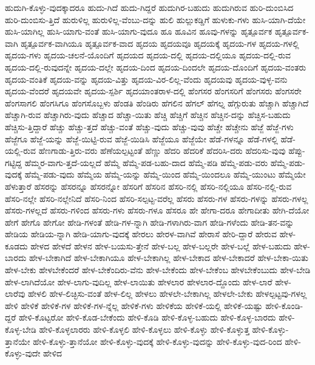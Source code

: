 {ಹುದುಗಿ-ಕೊಳ್ಳು-ವುದಕ್ಕಾದರೂ
ಹುದು-ಗಿದೆ
ಹುದು-ಗಿದ್ದರೆ
ಹುದುಗಿರ-ಬಹುದು
ಹುದುಗಿರುವ
ಹುರಿ-ದುಂಬಿಸಿದ
ಹುರಿ-ದುಂಬಿಸು-ತ್ತಿದೆ
ಹುರುಳಿಲ್ಲ
ಹುರುಳಿಲ್ಲ-ವೆಂಬು-ದನ್ನು
ಹುಲಿ
ಹುಲ್ಲುಕಡ್ಡಿಗೆ
ಹುಳುಕು-ಗಳು
ಹುಸಿ-ಯಾಗಿ-ದೆಯೇ
ಹುಸಿ-ಯಾಗಿಲ್ಲ
ಹುಸಿ-ಯಾಗು-ವಂತೆ
ಹುಸಿ-ಯಾಗು-ವುದೂ
ಹೂ
ಹೂವಿನ
ಹೂವು-ಗಳನ್ನು
ಹೃತ್ಪೂರ್ವಕ
ಹೃತ್ಪೂರ್ವಕ-ವಾಗಿ
ಹೃತ್ಪೂರ್ವಕ-ವಾಗಿಯೂ
ಹೃತ್ಪೂರ್ವಕ-ವಾದ
ಹೃದಯ
ಹೃದಯವೂ
ಹೃದಯಕ್ಕೆ
ಹೃದಯ-ಗಳ
ಹೃದಯ-ಗಳಲ್ಲಿ
ಹೃದಯ-ಗಳು
ಹೃದಯ-ಚಲನೆ-ಯೊಂದಿಗೆ
ಹೃದಯದ
ಹೃದಯ-ದಲ್ಲಿ
ಹೃದಯ-ದಲ್ಲಿಯೂ
ಹೃದಯ-ದಲ್ಲಿ-ರುವ
ಹೃದಯ-ದಲ್ಲಿ-ರುವುದನ್ನೇ
ಹೃದಯ-ದಲ್ಲೇ
ಹೃದಯ-ದಿಂದ
ಹೃದಯ-ದಿಂದಲೇ
ಹೃದಯ-ದೊಂದಿಗೆ
ಹೃದಯ-ವಂತರು
ಹೃದಯ-ವಂತಿಕೆ
ಹೃದಯ-ವನ್ನು
ಹೃದಯ-ವಿತ್ತು
ಹೃದಯ-ವಿರ-ಲಿಲ್ಲ-ವೆಂದು
ಹೃದಯವು
ಹೃದಯ-ವುಳ್ಳ-ವನು
ಹೃದಯ-ವೆಂದರೆ
ಹೃದಯವೇ
ಹೃದಯ-ಸ್ಪರ್ಶಿ
ಹೃದಯಾಂತರಾಳ-ದಲ್ಲಿ
ಹೆಂಗಸರ
ಹೆಂಗಸರಿಗೆ
ಹೆಂಗಸರು
ಹೆಂಗಸರೇ
ಹೆಂಗಸಾಗಲಿ
ಹೆಂಗಸಿಗೂ
ಹೆಂಗಸೊಬ್ಬಳು
ಹೆಂಡತಿ
ಹೆಂಡಿರು
ಹೆಗಲಿನ
ಹೆಗಲ್
ಹೆಗಲ್ನ
ಹೆಗ್ಗುರುತು
ಹೆಚ್ಚಾಗಿ
ಹೆಚ್ಚಾಗಿದೆ
ಹೆಚ್ಚಾಗಿ-ರುವ
ಹೆಚ್ಚಾಗಿರು-ವುದು
ಹೆಚ್ಚಾದ
ಹೆಚ್ಚಾ-ಯಿತು
ಹೆಚ್ಚಿ
ಹೆಚ್ಚಿಗೆ
ಹೆಚ್ಚಿನ
ಹೆಚ್ಚಿನ-ದನ್ನು
ಹೆಚ್ಚಿಸ-ಬಹುದು
ಹೆಚ್ಚಿಸು-ತ್ತಿದ್ದಾರೆ
ಹೆಚ್ಚು
ಹೆಚ್ಚು-ತ್ತದೆ
ಹೆಚ್ಚು-ವಂತೆ
ಹೆಚ್ಚು-ವುದು
ಹೆಚ್ಚು-ವುವು
ಹೆಚ್ಚೇ
ಹೆಚ್ಚೇನು
ಹೆಜ್ಜೆ
ಹೆಜ್ಜೆ-ಗಳು
ಹೆಜ್ಜೆಗೂ
ಹೆಜ್ಜೆ-ಯನ್ನು
ಹೆಜ್ಜೆ-ಯಿಟ್ಟಿ-ರುವ
ಹೆಜ್ಜೆ-ಯಿಡಿಸಿ
ಹೆಜ್ಜೆಯೂ
ಹೆಜ್ಜೆಯೇ
ಹೆಡೆ-ಗಳನ್ನೂ
ಹೆಡೆ-ಗಳಲ್ಲಿ
ಹೆಡೆ-ಯಲ್ಲಿ-ರುವ
ಹೆಣಗಾಡು-ತ್ತಿರು-ವರು
ಹೆಣೆಯಲ್ಪಟ್ಟಂತೆ
ಹೆಣ್ಣು
ಹೆದರಿ
ಹೆದರಿಕೆ
ಹೆದರಿಸಿ-ದರು
ಹೆದರಿಸು-ವುವು
ಹೆಪ್ಪು-ಗಟ್ಟಿದ್ದ
ಹೆಮ್ಮರ-ವಾಗು-ತ್ತದೆ-ಯಲ್ಲದೆ
ಹೆಮ್ಮೆ
ಹೆಮ್ಮೆ-ಪಡ-ಬಹು-ದಾದ
ಹೆಮ್ಮೆ-ಪಡಿ
ಹೆಮ್ಮೆ-ಪಡು-ವರು
ಹೆಮ್ಮೆ-ಪಡು-ವುದಕ್ಕೆ
ಹೆಮ್ಮೆ-ಪಡು-ವುದು
ಹೆಮ್ಮೆಯ
ಹೆಮ್ಮೆ-ಯನ್ನು
ಹೆಮ್ಮೆ-ಯಿಂದ
ಹೆಮ್ಮೆ-ಯಿಂದಲೂ
ಹೆಮ್ಮೆ-ಯುಂಟು
ಹೆಮ್ಮೆಯೇ
ಹೆಳುತ್ತಾರೆ
ಹೆಸರನ್ನು
ಹೆಸರನ್ನೂ
ಹೆಸರನ್ನೋ
ಹೆಸರಿಗೆ
ಹೆಸರಿನ
ಹೆಸರಿ-ನಲ್ಲಿ
ಹೆಸರಿ-ನಲ್ಲಿಯೂ
ಹೆಸರಿ-ನಲ್ಲಿ-ರುವ
ಹೆಸರಿ-ನಲ್ಲೇ
ಹೆಸರಿ-ನಲ್ಲೇನಿದೆ
ಹೆಸರಿ-ನಿಂದ
ಹೆಸರಿ-ಸಲ್ಪಟ್ಟ-ವರೆಲ್ಲ
ಹೆಸರು
ಹೆಸರು-ಗಳ
ಹೆಸರು-ಗಳನ್ನು
ಹೆಸರು-ಗಳಲ್ಲ
ಹೆಸರು-ಗಳಲ್ಲದೆ
ಹೆಸರು-ಗಳಿಂದ
ಹೆಸರು-ಗಳು
ಹೆಸರು-ಗಳೂ
ಹೆಸರೂ
ಹೇ
ಹೇಗಾ-ದರೂ
ಹೇಗಾದೀತು
ಹೇಗಿ-ದೆಯೋ
ಹೇಗೆ
ಹೇಗೊ
ಹೇಗೋ
ಹೇಡಿ-ಗಳಂತೆ
ಹೇಡಿ-ಗಳ-ನ್ನಾಗಿ
ಹೇಡಿ-ಗಳಾಗಿರು-ವಾಗ
ಹೇಡಿ-ಗಳೆಂದು
ಹೇಡಿ-ತನ-ವನ್ನು
ಹೇಡಿಯ
ಹೇಡಿಯ-ನ್ನಾಗಿ
ಹೇಡಿ-ಯಾಗು-ವುದಕ್ಕೆ
ಹೇರಲು
ಹೇರಳ-ವಾಗಿವೆ
ಹೇರಾಸೆ
ಹೇರಿ-ದ್ದಾರೆ
ಹೇರುವ
ಹೇಳ-ಕೂಡದು
ಹೇಳದ
ಹೇಳದೆ
ಹೇಳನ
ಹೇಳ-ಬಯಸು-ತ್ತೇನೆ
ಹೇಳ-ಬಲ್ಲ
ಹೇಳ-ಬಲ್ಲರೇ
ಹೇಳ-ಬಲ್ಲೆ
ಹೇಳ-ಬಹುದು
ಹೇಳ-ಬಾರದು
ಹೇಳ-ಬೇಕಾಗಿದೆ
ಹೇಳ-ಬೇಕಾಗಿಯೂ
ಹೇಳ-ಬೇಕಾಗಿಲ್ಲ
ಹೇಳ-ಬೇಕಾದ
ಹೇಳ-ಬೇಕಾದರೆ
ಹೇಳ-ಬೇಕಾ-ಯಿತು
ಹೇಳ-ಬೇಕು
ಹೇಳಬೇಕೆಂದರೆ
ಹೇಳ-ಬೇಕೆಂದಿರು-ವೆನು
ಹೇಳ-ಬೇಕೆಂದು
ಹೇಳ-ಬೇಕೆಂಬ
ಹೇಳಬೇಕೆಂಬುದು
ಹೇಳ-ಬೇಡಿ
ಹೇಳ-ಲಾಗಿದೆಯೋ
ಹೇಳ-ಲಾಗು-ವುದಿಲ್ಲ
ಹೇಳ-ಲಾಯಿತು
ಹೇಳಲಾರ
ಹೇಳಲಾರ-ದ್ದೊಂದು
ಹೇಳ-ಲಾರೆ
ಹೇಳ-ಲಾರೆವು
ಹೇಳಲಿ
ಹೇಳ-ಲಿಚ್ಛಿಸು-ವಂತೆ
ಹೇಳ-ಲಿಲ್ಲ
ಹೇಳಲು
ಹೇಳಲೇ-ಬೇಕಾಗಿಲ್ಲ
ಹೇಳಲೇ-ಬೇಕು
ಹೇಳಲ್ಪಟ್ಟವು-ಗಳಲ್ಲ
ಹೇಳಿ
ಹೇಳಿಕೆ
ಹೇಳಿಕೆ-ಗಳ
ಹೇಳಿಕೆ-ಗಳ-ನ್ನೆಲ್ಲ
ಹೇಳಿಕೆ-ಗಳು
ಹೇಳಿಕೆಯ
ಹೇಳಿಕೆ-ಯಲ್ಲಿ
ಹೇಳಿಕೆ-ಯಷ್ಟು
ಹೇಳಿ-ಕೊಂಡಿ-ದ್ದರೆ
ಹೇಳಿ-ಕೊಟ್ಟರೋ
ಹೇಳಿ-ಕೊಡ-ಬೇಕೆಂದು
ಹೇಳಿ-ಕೊಡಿ
ಹೇಳಿ-ಕೊಳ್ಳ-ಬಹುದು
ಹೇಳಿ-ಕೊಳ್ಳ-ಬಾರದು
ಹೇಳಿ-ಕೊಳ್ಳ-ಬೇಡಿ
ಹೇಳಿ-ಕೊಳ್ಳಲಾರರು
ಹೇಳಿ-ಕೊಳ್ಳಲಿ
ಹೇಳಿ-ಕೊಳ್ಳಲು
ಹೇಳಿ-ಕೊಳ್ಳು
ಹೇಳಿ-ಕೊಳ್ಳುತ್ತ
ಹೇಳಿ-ಕೊಳ್ಳು-ತ್ತಾನೆಯೇ
ಹೇಳಿ-ಕೊಳ್ಳು-ತ್ತಾನೆಯೋ
ಹೇಳಿ-ಕೊಳ್ಳು-ವುದಕ್ಕೆ
ಹೇಳಿ-ಕೊಳ್ಳು-ವುದನ್ನು
ಹೇಳಿ-ಕೊಳ್ಳು-ವುದ-ರಿಂದ
ಹೇಳಿ-ಕೊಳ್ಳು-ವುದೇ
ಹೇಳಿದ
}
